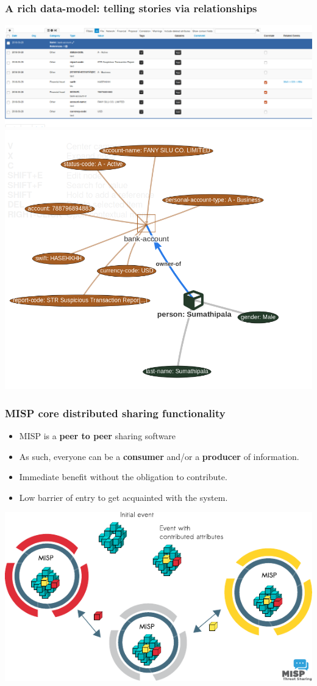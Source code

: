 \begin{frame}
        \frametitle{A rich data-model: telling stories via relationships}
        \includegraphics[scale=0.24]{screenshots/bankaccount.png}
        \includegraphics[scale=0.18]{screenshots/bankview.png}
\end{frame}


\begin{frame}
\frametitle{MISP core distributed sharing functionality}
\begin{itemize}
\item MISP is a {\bf peer to peer} sharing software
\item As such, everyone can be a {\bf consumer} and/or a {\bf producer} of information.
\item Immediate benefit without the obligation to contribute.
\item Low barrier of entry to get acquainted with the system.
\end{itemize}
\includegraphics[scale=0.9]{misp-distributed.pdf}
\end{frame}

